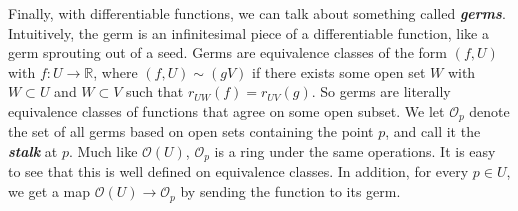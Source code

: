 \documentclass[psamsfonts]{amsart}
\theoremstyle{definition}
\theoremstyle{remark}
\renewcommand{\O}{\mathscr{O}}
\newcommand{\R}{\mathbb{R}}
\newcommand{\ib}[1]{\textbf{\textit{#1}}}
\begin{document}
Finally, with differentiable functions, we can talk about something called \ib{germs}. Intuitively, the germ is an infinitesimal piece of a differentiable function, like a germ sprouting out of a seed. Germs are equivalence classes of the form $(f,U)$ with $f : U \to \R$, where $(f,U) \sim (g V)$ if there exists some open set $W$ with $W \subset U$ and $W \subset V$ such that $r_{UW}(f) = r_{UV}(g)$. So germs are literally equivalence classes of functions that agree on some open subset. We let $\O_p$ denote the set of all germs based on open sets containing the point $p$, and call it the \ib{stalk} at $p$. Much like $\O(U)$, $\O_p$ is a ring under the same operations. It is easy to see that this is well defined on equivalence classes. In addition, for every $p \in U$, we get a map $\O(U) \to \O_p$ by sending the function to its germ.
\end{document}
